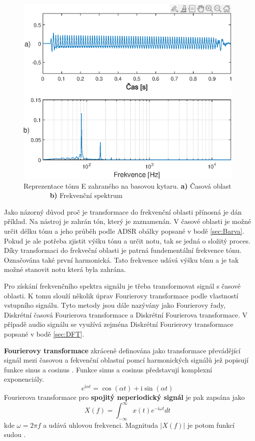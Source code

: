   \begin{figure}[H]
    \centering
        \includegraphics[width = 0.8\linewidth]{obrazky/Bass_tone_spectrum.eps}
    \caption{Reprezentace tónu E zahraného na basovou kytaru. \textbf{a)} Časová oblast ~ ~ ~ ~ ~\textbf{b)} Frekvenční spektrum}
    \label{fig:Bass_tone}
\end{figure}
  
  Jako názorný důvod proč je transformace do frekvenční oblasti přínosná je dán příklad. Na nástroj je zahrán tón, který je zaznamenán. 
  V časové oblasti je možné určit délku tónu a jeho průběh podle ADSR obálky popsané v bodě \ref{sec:Barva}.
  Pokud je ale potřeba zjistit výšku tónu a určit notu, tak se jedná o složitý proces.
  Díky transformaci do frekveční oblasti je patrná fundementální frekvence tónu.
  Označována také první harmonická.
  Tato frekvence udává výšku tónu a je tak možné stanovit notu která byla zahrána.

  Pro získání frekvenčního spektra signálu je třeba transformovat signál s časové oblasti. K tomu slouží několik úprav Fourierovy transformace podle vlastností vstupního signálu. Tyto metody jsou dále nazývány jako Fourierovy řady, Diskrétní časová Fourierova transformace a Diskrétní Fourierova transformace. V případě audio signálu se využívá zejména Diskrétní Fourierovy transformace popsané v bodě \ref{sec:DFT}.

  \textbf{Fourierovy transformace} zkráceně definována jako transformace převádějící signál mezi časovou a fekvenční oblastní pomcí harmonických signálů jež popisují funkce sinus a cosinus \cite{bracewell1978fourier}. Funkce sinus a cosinus představují komplexní exponenciály.
  \begin{equation}
    e^{\mathrm{i} \alpha t} = \cos(\alpha t) + \mathrm{i} \sin(\alpha t)
  \end{equation}
  Fourierova transformace pro \textbf{ spojitý neperiodický signál} je pak zapsána jako
  \begin{equation}
    X(f) = \int_{-\infty}^{\infty} x(t) e^{-\mathrm{i}\omega t} dt
  \end{equation}
  kde $\omega = 2\pi f$ a udává uhlovou frekvenci. Magnituda $|X(f)|$ je potom funkcí sudou \cite{sneddon1995fourier}.

